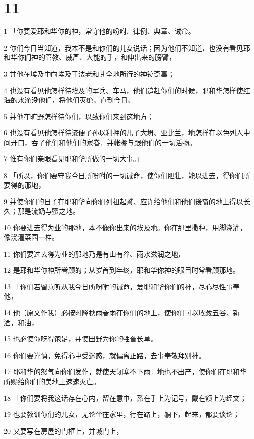 \chapter{11}

\par 1 「你要爱耶和华你的神，常守他的吩咐、律例、典章、诫命。
\par 2 你们今日当知道，我本不是和你们的儿女说话；因为他们不知道，也没有看见耶和华你们神的管教、威严、大能的手，和伸出来的膀臂，
\par 3 并他在埃及中向埃及王法老和其全地所行的神迹奇事；
\par 4 也没有看见他怎样待埃及的军兵、车马，他们追赶你们的时候，耶和华怎样使红海的水淹没他们，将他们灭绝，直到今日，
\par 5 并他在旷野怎样待你们，以致你们来到这地方；
\par 6 也没有看见他怎样待流便子孙以利押的儿子大坍、亚比兰，地怎样在以色列人中间开口，吞了他们和他们的家眷，并帐棚与跟他们的一切活物。
\par 7 惟有你们亲眼看见耶和华所做的一切大事。」
\par 8 「所以，你们要守我今日所吩咐的一切诫命，使你们胆壮，能以进去，得你们所要得的那地，
\par 9 并使你们的日子在耶和华向你们列祖起誓、应许给他们和他们後裔的地上得以长久；那是流奶与蜜之地。
\par 10 你要进去得为业的那地，本不像你出来的埃及地。你在那里撒种，用脚浇灌，像浇灌菜园一样。
\par 11 你们要过去得为业的那地乃是有山有谷、雨水滋润之地，
\par 12 是耶和华你神所眷顾的；从岁首到年终，耶和华你神的眼目时常看顾那地。
\par 13 「你们若留意听从我今日所吩咐的诫命，爱耶和华你们的神，尽心尽性事奉他，
\par 14 他（原文作我）必按时降秋雨春雨在你们的地上，使你们可以收藏五谷、新酒，和油，
\par 15 也必使你吃得饱足，并使田野为你的牲畜长草。
\par 16 你们要谨慎，免得心中受迷惑，就偏离正路，去事奉敬拜别神。
\par 17 耶和华的怒气向你们发作，就使天闭塞不下雨，地也不出产，使你们在耶和华所赐给你们的美地上速速灭亡。
\par 18 「你们要将我这话存在心内，留在意中，系在手上为记号，戴在额上为经文；
\par 19 也要教训你们的儿女，无论坐在家里，行在路上，躺下，起来，都要谈论；
\par 20 又要写在房屋的门框上，并城门上，
